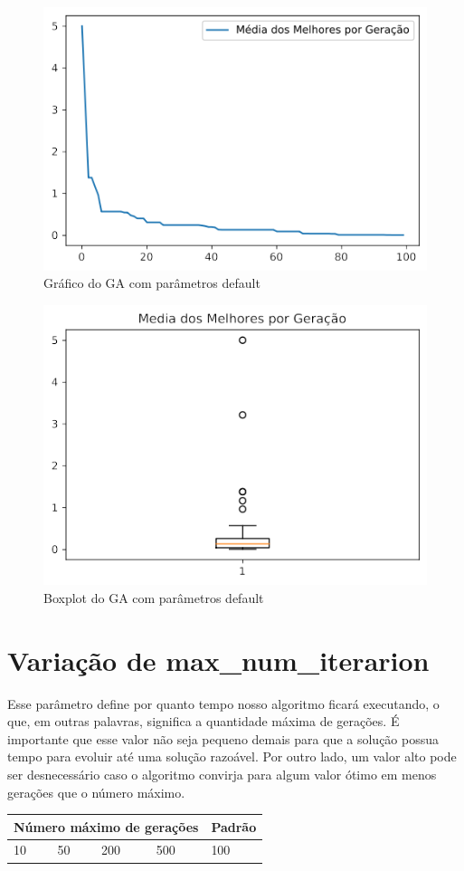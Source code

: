 \documentclass[12pt]{article}
\begin{document}
	\begin{figure}[H]
		\centering
		\includegraphics[width=0.5\linewidth]{Imagens/graficoInicial}
		\caption{Gráfico do GA com parâmetros default}
		\label{fig:graficoinicial}
	\end{figure}
	\begin{figure}[H]
		\centering
		\includegraphics[width=0.5\linewidth]{Imagens/boxplotInicial}
		\caption{Boxplot do GA com parâmetros default}
		\label{fig:boxplotinicial}
	\end{figure}
	
	
	\section{Variação de max\_num\_iterarion} 
	
	Esse parâmetro define por quanto tempo nosso algoritmo ficará executando, o que, em outras palavras, significa a quantidade máxima de gerações. É importante que esse valor não seja pequeno demais para que a solução possua tempo para evoluir até uma solução razoável. Por outro lado, um valor alto pode ser desnecessário caso o algoritmo convirja para algum valor ótimo em menos gerações que o número máximo.
	
	\begin{table}[H]
		\centering
		\begin{tabular}{|l|l|l|l|l|}
			\hline
			\multicolumn{4}{|l|}{Número máximo de gerações}& Padrão \\ \hline
			10   & 50    & 200    & 500   & 100 \\ \hline
		\end{tabular}
	\end{table}
	
\end{document}
